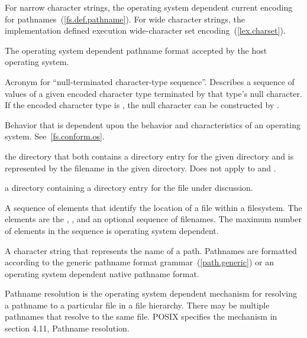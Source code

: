 For narrow character strings, the operating system dependent current encoding
for pathnames~(\ref{fs.def.pathname}). For wide character strings, the implementation defined execution
wide-character set encoding~(\ref{lex.charset}).

The operating system dependent pathname format accepted by the host operating system.

Acronym for ``null-terminated character-type sequence''. Describes a sequence
of values of a given encoded character type terminated by that type's null character. If
the encoded character type is , the null character can be constructed
by .

Behavior that is dependent upon the behavior
and characteristics of an operating system. See~\ref{fs.conform.os}.

 the directory that both contains a
directory entry for the given directory and is represented by the filename
 in the given directory.
\enternote Does not apply to  and . \exitnote

 a directory containing a directory
entry for the file under discussion.

A sequence of elements that identify
the location of a file within a filesystem.
The elements are the
,
,
and an optional sequence of filenames.
The maximum number of elements in the sequence is operating system dependent.

A character string that represents the name of a path. Pathnames are
formatted according to the generic pathname format grammar~(\ref{path.generic}) or an
operating system dependent
native pathname format.

Pathname resolution is the operating system dependent mechanism for resolving
a pathname to a particular file in a file hierarchy. There may be multiple
pathnames that resolve to the same file.
\enterexample POSIX specifies the mechanism in section 4.11, Pathname resolution.
\exitexample

